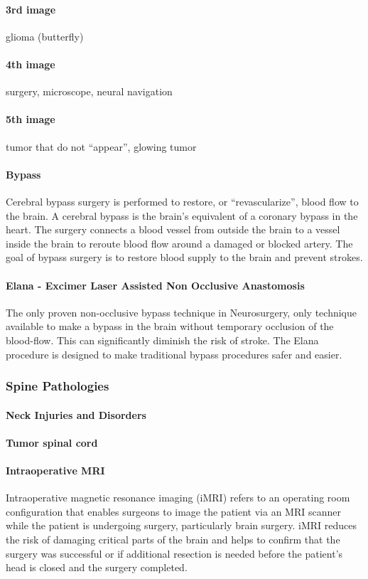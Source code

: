 \documentclass[12pt,article,oneside,a4paper]{memoir}
\begin{document}
\paragraph{3rd image} glioma (butterfly)
\paragraph{4th image} surgery, microscope, neural navigation
\paragraph{5th image} tumor that do not ``appear'', glowing tumor

\paragraph{Bypass}
Cerebral bypass surgery is performed to restore, or ``revascularize'', blood
flow to the brain. A cerebral bypass is the brain's equivalent of a coronary
bypass in the heart. The surgery connects a blood vessel from outside the brain
to a vessel inside the brain to reroute blood flow around a damaged or blocked
artery. The goal of bypass surgery is to restore blood supply to the brain and
prevent strokes.

\paragraph{Elana - Excimer Laser Assisted Non Occlusive Anastomosis}
The only proven non-occlusive bypass technique in Neurosurgery, only technique
available to make a bypass in the brain without temporary occlusion of the
blood-flow. This can significantly diminish the risk of stroke. The Elana
procedure is designed to make traditional bypass procedures safer and easier.

\subsubsection{Spine Pathologies}
\paragraph{Neck Injuries and Disorders}
\paragraph{Tumor spinal cord} 

\paragraph{Intraoperative MRI}
Intraoperative magnetic resonance imaging (iMRI) refers to an operating room
configuration that enables surgeons to image the patient via an MRI scanner
while the patient is undergoing surgery, particularly brain surgery. iMRI
reduces the risk of damaging critical parts of the brain and helps to confirm
that the surgery was successful or if additional resection is needed before the
patient’s head is closed and the surgery completed.
\end{document}
